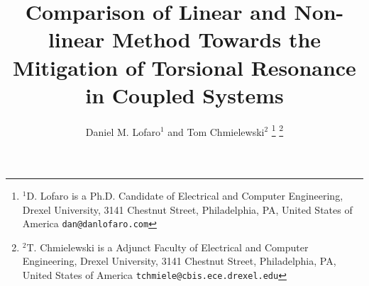 \documentclass[letterpaper, 10 pt, conference]{ieeeconf}  %
\title{\LARGE \bf
Comparison of Linear and Non-linear Method Towards the Mitigation of Torsional Resonance in Coupled Systems
}
\author{Daniel M. Lofaro$^{1}$ and Tom Chmielewski$^{2}$%
\thanks{$^{1}$D. Lofaro is a Ph.D. Candidate of Electrical and Computer Engineering,
        Drexel University, 3141 Chestnut Street, Philadelphia, PA, United States of America
        {\tt\small dan@danlofaro.com}}%
\thanks{$^{2}$T. Chmielewski is a Adjunct Faculty of Electrical and Computer Engineering,
        Drexel University, 3141 Chestnut Street, Philadelphia, PA, United States of America
        {\tt\small tchmiele@cbis.ece.drexel.edu}}%
}
\begin{document}
\maketitle
\thispagestyle{empty}
\pagestyle{empty}


\begin{abstract}

\end{abstract}

\IEEEpeerreviewmaketitle






%
%



\FloatBarrier

%
{}
  




\end{document}
